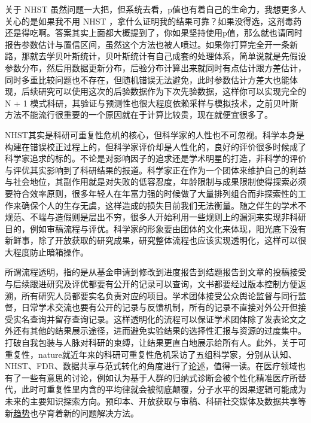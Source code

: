 \documentclass[]{tufte-book}
\begin{document}
关于 NHST 虽然问题一大把，但系统去看，p值也有着自己的生命力，我想更多人关心的是如果我不用 NHST ，拿什么证明我的结果可靠？如果没得选，这剂毒药还是得吃啊。答案其实上面都大概提到了，你如果坚持使用p值，那么就也请同时报告参数估计与置信区间，虽然这个方法也被人喷过。如果你打算完全开一条新路，那就去学贝叶斯统计，贝叶斯统计有自己成套的处理体系，简单说就是先假设参数分布，然后用数据更新分布，后验分布计算出来就同时有点估计跟方差估计，同时多重比较问题也不存在，但随机错误无法避免，此时参数估计方差大也能体现，后续研究可以使用这次的后验数据作为下次先验数据，这样你可以实现完全的 N + 1 模式科研，其验证与预测性也很大程度依赖采样与模拟技术，之前贝叶斯方法不能流行很重要的一个原因就在于计算比较贵，现在就便宜很多了。

NHST其实是科研可重复性危机的核心，但科学家的人性也不可忽视。科学本身是构建在错误校正过程上的，但科学家评价却是人性化的，良好的评价很多时候成了科学家追求的标的。不论是对影响因子的追求还是学术明星的打造，非科学的评价与评优其实影响到了科研结果的报道。科学家正在作为一个团体来维护自己的利益与社会地位，其副作用就是对失败的低容忍度，年龄限制与成果限制使得探索必须要符合效率原则，很多年轻人在年富力强的时候做了大量排列组合而非探索性的工作来确保个人的生存无虞，这样造成的损失目前我们无法衡量。随之伴生的学术不规范、不端与造假则是层出不穷，很多人开始利用一些规则上的漏洞来实现非科研目的，例如审稿流程与评优。科学家的形象要由团体的文化来体现，阳光底下没有新鲜事，除了开放获取的研究成果，研究整体流程也应该实现透明化，这样可以很大程度防止暗箱操作。

所谓流程透明，指的是从基金申请到修改到进度报告到结题报告到文章的投稿接受与后续跟进研究及评优都要有公开的记录可以查询，文书都要经过版本控制方便返溯，所有研究人员都要实名负责对应的项目。学术团体接受公众舆论监督与同行监督，日常学术交流也要有公开的记录与反馈机制，所有的记录不直接对外公开但接受实名查询并留存查询记录。这样透明化的流程可以保证学术团体除了发表论文之外还有其他的结果展示途径，进而避免实验结果的选择性汇报与资源的过度集中。打破自我包装与人脉对科研的束缚，让结果更直白地展示给所有人。此外，关于可重复性，nature就近年来的科研可重复性危机采访了五组科学家，分别从认知、NHST、FDR、数据共享与范式转化的角度进行了\href{https://www.nature.com/articles/d41586-017-07522-z}{论述}，值得一读。在医疗领域也有了一些有意思的讨论，例如认为基于人群的归纳式诊断会被个性化精准医疗所替代，此时可重复性里内含的平均律就会被彻底颠覆，分子水平的因果逻辑可能成为未来的主要知识探索方向。预印本、开放获取与审稿、科研社交媒体及数据共享等新\href{https://theoreticalecology.wordpress.com/2019/01/22/tree-species-richness-and-its-effects-on-productivity-neither-global-nor-consistent/}{趋势}也孕育着新的问题解决方法。
\end{document}
